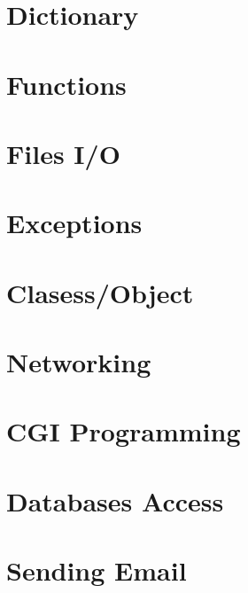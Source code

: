 \documentclass{wileySix}
\begin{document}
\chapter{Dictionary}


\chapter{Functions}


%

\chapter{Files I/O}


\chapter{Exceptions}


\chapter{Clasess/Object}


%

\chapter{Networking}


\chapter{CGI Programming}


\chapter{Databases Access}

 
\chapter{Sending Email}

\end{document}
